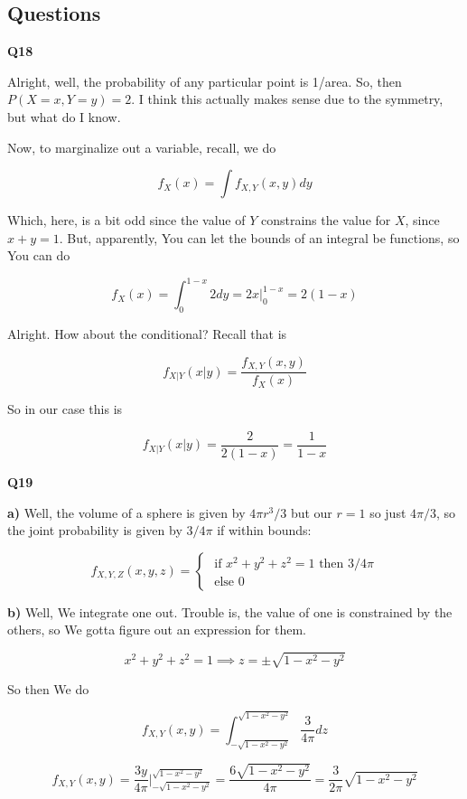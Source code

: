 \documentclass{article}
\begin{document}
	\subsection{Questions}
	
		\textbf{Q18}
		
			Alright, well, the probability of any particular point is 1/area. So, then $P(X=x, Y=y) = 2$. I think this actually makes sense due to the symmetry, but what do I know.
			
			Now, to marginalize out a variable, recall, we do
			
			\[ f_X(x) = \int f_{X, Y}(x, y) dy \]
		 
			Which, here, is a bit odd since the value of $Y$ constrains the value for $X$, since $x+y=1$. But, apparently, You can let the bounds of an integral be functions, so You can do
			
			\[ f_X(x) = \int_0^{1-x} 2 dy= 2x\big|^{1-x}_0 = 2(1-x) \]
		
			Alright. How about the conditional? Recall that is
			
			\[ f_{X|Y}(x|y) = \frac{f_{X, Y}(x, y)}{f_X(x)} \]
		
			So in our case this is
			
			\[ f_{X|Y}(x|y) = \frac{2}{2(1-x)} = \frac{1}{1-x} \]
			
			\hfill
			
		\textbf{Q19} 
		
			\textbf{a)} Well, the volume of a sphere is given by $4\pi r^3/3 $ but our $r=1$ so just $4\pi/3$, so the joint probability is given by $3/4\pi$ if within bounds:
			
			\[ f_{X, Y, Z}(x, y, z) = \begin{cases}\text{ if } x^2+y^2+z^2 = 1 \text{ then } 3/4\pi \\
													\text{ else }0
										\end{cases} \]		
			
			\textbf{b)} Well, We integrate one out. Trouble is, the value of one is constrained by the others, so We gotta figure out an expression for them.
			
			\[x^2 + y^2 + z^2 = 1 \implies z = \pm\sqrt{1-x^2-y^2} \]
			
			So then We do
			
			\[ f_{X, Y}(x, y) = \int^{\sqrt{1-x^2-y^2}}_{-\sqrt{1-x^2-y^2}} \frac{3}{4\pi} dz \]
			
			\[ f_{X, Y}(x, y) = \frac{3y}{4\pi}\bigg|^{\sqrt{1-x^2-y^2}}_{-\sqrt{1-x^2-y^2}} = \frac{6\sqrt{1-x^2-y^2}}{4\pi} = \frac{3}{2\pi}\sqrt{1-x^2-y^2}   \]
			
\end{document}
